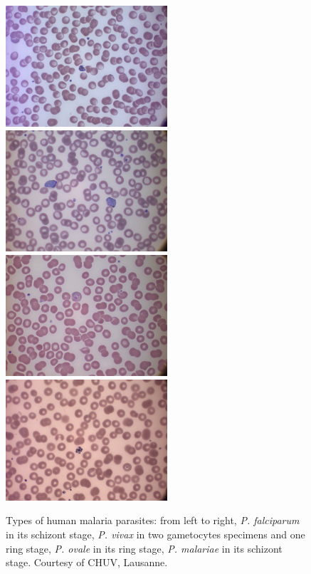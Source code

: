 \documentclass[final,a4paper,12pt,english]{UnicaPhdThesis3}
\begin{document}
	\begin{figure}[H]
		\centering
		\includegraphics[width=6cm]{images/malaria/f2_Pfalciparum}
		\includegraphics[width=6cm]{images/malaria/f2_Pvivax}
		\includegraphics[width=6cm]{images/malaria/f2_Povale}
		\includegraphics[width=6cm]{images/malaria/f2_Pmalariae}
		\caption{\label{fig:malaria_types}Types of human malaria parasites: from left to right, \emph{P. falciparum} in its schizont stage, \emph{P. vivax} in two gametocytes specimens and one ring stage, \emph{P. ovale} in its ring stage, \emph{P. malariae} in its schizont stage.
			Courtesy of CHUV, Lausanne.}
	\end{figure}
	
\end{document}
